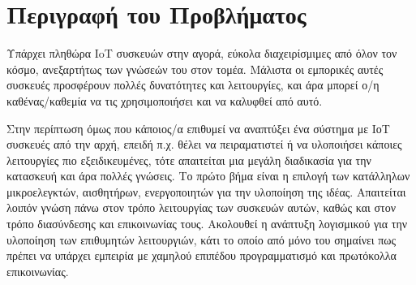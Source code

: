 \section{Περιγραφή του Προβλήματος}
\label{section:problem_description}

Υπάρχει πληθώρα IoT συσκευών στην αγορά, εύκολα διαχειρίσμιμες από όλον τον κόσμο, ανεξαρτήτως των γνώσεών του στον τομέα. Μάλιστα οι εμπορικές αυτές συσκευές προσφέρουν πολλές δυνατότητες και λειτουργίες, και άρα μπορεί ο/η καθένας/καθεμία να τις χρησιμοποιήσει και να καλυφθεί από αυτό.

Στην περίπτωση όμως που κάποιος/α επιθυμεί να αναπτύξει ένα σύστημα με ΙοΤ συσκευές από την αρχή, επειδή π.χ. θέλει να πειραματιστεί ή να υλοποιήσει κάποιες λειτουργίες πιο εξειδικευμένες, τότε απαιτείται μια μεγάλη διαδικασία για την κατασκευή και άρα πολλές γνώσεις. Το πρώτο βήμα είναι η επιλογή των κατάλληλων μικροελεγκτών, αισθητήρων, ενεργοποιητών για την υλοποίηση της ιδέας. Απαιτείται λοιπόν γνώση πάνω στον τρόπο λειτουργίας των συσκευών αυτών, καθώς και στον τρόπο διασύνδεσης και επικοινωνίας τους. Ακολουθεί η ανάπτυξη λογισμικού για την υλοποίηση των επιθυμητών λειτουργιών, κάτι το οποίο από μόνο του σημαίνει πως πρέπει να υπάρχει εμπειρία με χαμηλού επιπέδου προγραμματισμό και πρωτόκολλα επικοινωνίας.
